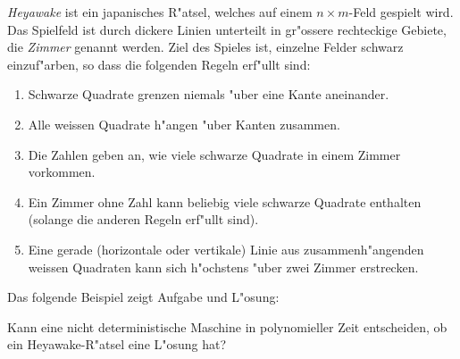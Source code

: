 {\em Heyawake} ist ein japanisches R"atsel, welches auf einem $n\times m$-Feld
gespielt wird. Das Spielfeld ist durch dickere Linien unterteilt in gr"ossere rechteckige Gebiete, die {\it Zimmer} genannt werden. 
Ziel des Spieles ist, einzelne Felder schwarz einzuf"arben, so dass die
folgenden Regeln erf"ullt sind:
\begin{enumerate}
\item
Schwarze Quadrate grenzen niemals "uber eine Kante aneinander.
\item
Alle weissen Quadrate h"angen "uber Kanten zusammen.
\item
Die Zahlen geben an, wie viele schwarze Quadrate in einem Zimmer vorkommen.
\item
Ein Zimmer ohne Zahl kann beliebig viele schwarze Quadrate enthalten
(solange die anderen Regeln erf"ullt sind).
\item
Eine gerade (horizontale oder vertikale) Linie aus zusammenh"angenden
weissen Quadraten kann sich h"ochstens "uber zwei Zimmer erstrecken.
\end{enumerate}
Das folgende Beispiel zeigt Aufgabe und L"osung:
\begin{center}
\qquad
{}
\end{center}

Kann eine nicht deterministische Maschine in polynomieller Zeit entscheiden,
ob ein Heyawake-R"atsel eine L"osung hat?

